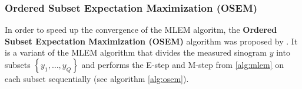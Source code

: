 
\subsubsection{Ordered Subset Expectation Maximization (OSEM)}

In order to speed up the convergence of the MLEM algoritm,
the \textbf{Ordered Subset Expectation Maximization (OSEM)} algorithm was proposed by \cite{Hudson1994}. It is a variant of the MLEM algorithm that divides the measured sinogram $y$ into subsets $\left\{y_1, \hdots, y_Q\right\}$ and performs the E-step and M-step from \ref{alg:mlem} on each subset sequentially (see algorithm \ref{alg:osem}).


